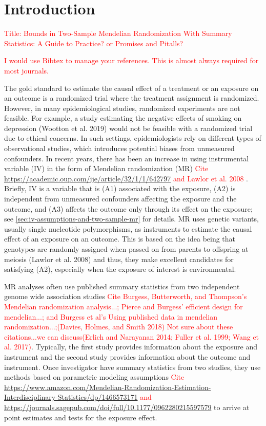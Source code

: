\documentclass[
]{article}
\author{}
\date{\vspace{-2.5em}}
\theoremstyle{plain}
\begin{document}
{
\setcounter{tocdepth}{2}
\tableofcontents
}
\newpage

\hypertarget{introduction}{%
\section{Introduction}\label{introduction}}

\textcolor{red}{Title: Bounds in Two-Sample Mendelian Randomization With Summary Statistics: A Guide to Practice? or Promises and Pitalls?}

\textcolor{red}{I would use Bibtex to manage your references. This is almost always required for most journals.}

The gold standard to estimate the causal effect of a treatment or an exposure on an outcome is a randomized trial where the treatment assignment is randomized. However, in many epidemiological studies, randomized experiments are not feasible. For example, a study estimating the negative effects of smoking on depression (Wootton et al. 2019) would not be feasible with a randomized trial due to ethical concerns. In such settings, epidemiologists rely on different types of observational studies, which introduces potential biases from unmeasured confounders. In recent years, there has been an increase in using instrumental variable (IV) in the form of Mendelian randomization (MR) \textcolor{red}{Cite \url{https://academic.oup.com/ije/article/32/1/1/642797} and Lawlor et al. 2008} . Briefly, IV is a variable that is (A1) associated with the exposure, (A2) is independent from unmeasured confounders affecting the exposure and the outcome, and (A3) affects the outcome only through its effect on the exposure; see \ref{sec:iv-assumptions-and-two-sample-mr} for details. MR uses genetic variants, usually single nucleotide polymorphisms, as instruments to estimate the causal effect of an exposure on an outcome. This is based on the idea being that genotypes are randomly assigned when passed on from parents to offspring at meiosis (Lawlor et al. 2008) and thus, they make excellent candidates for satisfying (A2), especially when the exposure of interest is environmental.

MR analyses often use published summary statistics from two independent genome wide association studies \textcolor{red}{Cite Burgess, Butterworth, and Thompson's Mendelian randomization analysis...; Pierce and Burgess' efficient design for mendelian...; and Burgess et al's Using published data in mendelian randomization...;(Davies, Holmes, and Smith 2018)} \textcolor{red}{Not sure about these citations...we can discuss(Erlich and Narayanan 2014; Fuller et al. 1999; Wang et al. 2017)}. Typically, the first study provides information about the exposure and instrument and the second study provides information about the outcome and instrument. Once investigator have summary statistics from two studies,  they use methods based on parametric modeling assumptions \textcolor{red}{Cite \url{https://www.amazon.com/Mendelian-Randomization-Estimation-Interdisciplinary-Statistics/dp/1466573171} and \url{https://journals.sagepub.com/doi/full/10.1177/0962280215597579}} to arrive at point estimates and tests for the exposure effect.
\end{document}
